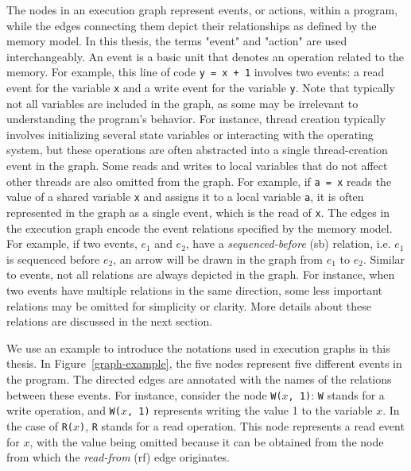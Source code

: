 The nodes in an execution graph represent events, or actions, within a program, while the edges connecting them depict their relationships as defined by the memory model. In this thesis, the terms "event" and "action" are used interchangeably. An event is a basic unit that denotes an operation related to the memory. For example, this line of code \texttt{y = x + 1} involves two events: a read event for the variable \texttt{x} and a write event for the variable \texttt{y}. Note that typically not all variables are included in the graph, as some may be irrelevant to understanding the program's behavior. For instance, thread creation typically involves initializing several state variables or interacting with the operating system, but these operations are often abstracted into a single thread-creation event in the graph. Some reads and writes to local variables that do not affect other threads are also omitted from the graph. For example, if \texttt{a = x} reads the value of a shared variable \texttt{x} and assigns it to a local variable \texttt{a}, it is often represented in the graph as a single event, which is the read of \texttt{x}. The edges in the execution graph encode the event relations specified by the memory model. For example, if two events, $e_1$ and $e_2$, have a \textit{sequenced-before} (sb) relation, i.e. $e_1$ is sequenced before $e_2$, an arrow will be drawn in the graph from $e_1$ to $e_2$. Similar to events, not all relations are always depicted in the graph. For instance, when two events have multiple relations in the same direction, some less important relations may be omitted for simplicity or clarity. More details about these relations are discussed in the next section.




We use an example to introduce the notations used in execution graphs in this thesis. In Figure~\ref{graph-example}, the five nodes represent five different events in the program. The directed edges are annotated with the names of the relations between these events. For instance, consider the node \texttt{W($x$, 1)}: \texttt{W} stands for a write operation, and \texttt{W($x$, 1)} represents writing the value 1 to the variable \texttt{$x$}. In the case of \texttt{R($x$)}, \texttt{R} stands for a read operation. This node represents a read event for \texttt{$x$}, with the value being omitted because it can be obtained from the node from which the \textit{read-from} (rf) edge originates.

